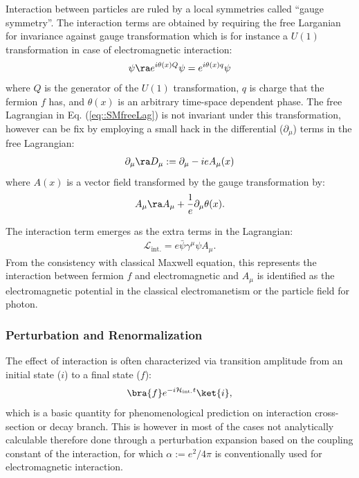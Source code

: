 Interaction between particles are ruled by a local symmetries called ``gauge symmetry''. 
The interaction terms are obtained by requiring the free Larganian for invariance against gauge transformation which is for instance a $U(1)$ transformation in case of electromagnetic interaction:
\begin{align}
\psi \ra e^{i\theta(x) Q} \psi = e^{i\theta(x) q} \psi
\end{align}
where $Q$ is the generator of the $U(1)$ transformation, $q$ is charge that the fermion $f$ has, and $\theta(x)$ is an arbitrary time-space dependent phase.
The free Lagrangian in Eq. (\ref{eq::SMfreeLag}) is not invariant under this transformation, however can be fix by employing a small hack in the differential ($\partial_\mu$) terms in the free Lagrangian:
\begin{align}
\partial_\mu \ra D_\mu := \partial_\mu - ieA_\mu (x)
\end{align}
where $A(x)$ is a vector field transformed by the gauge transformation by:
\begin{align}
A_\mu \ra A_\mu + \frac{1}{e} \partial_\mu \theta(x).
\end{align}

The interaction term emerges as the extra terms in the Lagrangian:
\begin{align}
\mathcal{L}_{\mathrm{int.}} = e\bar{\psi} \gamma^\mu \psi A_\mu.
\label{eq::SMfreeLag}
\end{align}
From the consistency with classical Maxwell equation, this represents the interaction between fermion $f$ and electromagnetic
and $A_\mu$ is identified as the electromagnetic potential in the classical electromanetism or the particle field for photon. \\



\subsubsection{Perturbation and Renormalization}
The effect of interaction is often characterized via transition amplitude from an initial state ($i$) to a final state ($f$):
\begin{align}
\bra{f} e^{-i\mathcal{H}_{\mathrm{int.}}t} \ket{i},
\end{align}
which is a basic quantity for phenomenological prediction on interaction cross-section or decay branch. 
This is however in most of the cases not analytically calculable therefore done through a perturbation expansion based on the coupling constant of the interaction, for which $\alpha := e^2/4\pi$ is conventionally used for electromagnetic interaction. 


